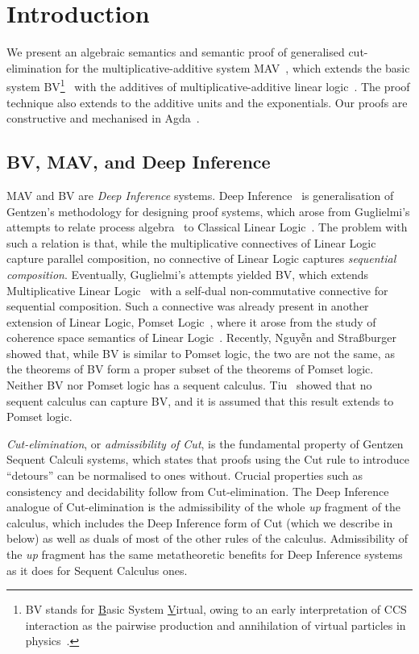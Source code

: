 \section{Introduction}\label{sec:introduction}

We present an algebraic semantics and semantic proof of generalised cut-elimination for the multiplicative-additive system MAV~\cite{Horne15:mav}, which extends the basic system BV\footnote{
      BV stands for \underline{B}asic System \underline{V}irtual, owing to an early interpretation of CCS interaction as the pairwise production and annihilation of virtual particles in physics~\cite[]{Horne15:mav}.
}~\cite{Guglielmi99:bv,Guglielmi07:sis} with the additives of multiplicative-additive linear logic~\cite[MALL]{Girard87:ll}. The proof technique also extends to the additive units and the exponentials.
Our proofs are constructive and mechanised in Agda~\cite{Agda264}.

\subsection{BV, MAV, and Deep Inference}

MAV and BV are \emph{Deep Inference} systems. Deep Inference~\cite{Guglielmi14:di} is generalisation of Gentzen's methodology for designing proof systems, which arose from Guglielmi's attempts to relate process algebra~\cite[CCS]{Milner80:CCS,Milner89:CC} to Classical Linear Logic~\cite[CLL]{Girard87:ll}.
The problem with such a relation is that, while the multiplicative connectives of Linear Logic capture parallel composition, no connective of Linear Logic captures \emph{sequential composition}.
Eventually, Guglielmi's attempts yielded BV, which extends Multiplicative Linear Logic~\cite[MLL]{Girard87:ll} with a self-dual non-commutative connective for sequential composition.
Such a connective was already present in another extension of Linear Logic, Pomset Logic~\cite{Retore97:pomset}, where it arose from the study of coherence space semantics of Linear Logic~\cite[]{GirardTL89:proofs}.
Recently, Nguyễn and Stra{\ss}burger~\cite{NguyenS22:bvisnotpl,NguyenS23:complexity} showed that, while BV is similar to Pomset logic, the two are not the same, as the theorems of BV form a proper subset of the theorems of Pomset logic.
Neither BV nor Pomset logic has a sequent calculus. Tiu~\cite{Tiu06:sisii} showed that no sequent calculus can capture BV, and it is assumed that this result extends to Pomset logic.

\emph{Cut-elimination}, or \emph{admissibility of Cut}, is the fundamental property of Gentzen Sequent Calculi systems, which states that proofs using the Cut rule to introduce ``detours'' can be normalised to ones without. Crucial properties such as consistency and decidability follow from Cut-elimination. The Deep Inference analogue of Cut-elimination is the admissibility of the whole \emph{up} fragment of the calculus, which includes the Deep Inference form of Cut (which we describe in  below) as well as duals of most of the other rules of the calculus. Admissibility of the \emph{up} fragment has the same metatheoretic benefits for Deep Inference systems as it does for Sequent Calculus ones.

